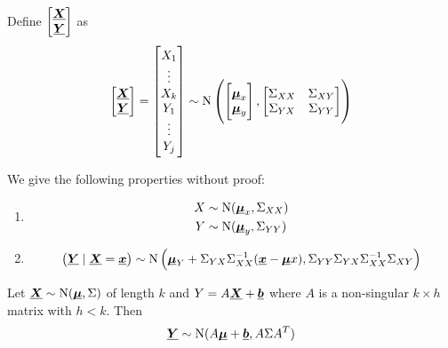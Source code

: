 \documentclass[14pt]{extarticle}
\newcommand{\Normal}{{\operatorfont N}}
\renewcommand{\vec}[1]{\uvec{#1}}
\begin{document}
\begin{proposition}
    \label{prop:multivariate:prop}
    Define $\begin{bmatrix} \vec X \\ \vec Y \end{bmatrix}$ as
    \begin{equation}
        \begin{bmatrix}
            \vec X \\ \vec Y
        \end{bmatrix}
        =
        \begin{bmatrix}
            X_1 \\ \vdots \\ X_k \\ Y_1 \\ \vdots\\ Y_j
        \end{bmatrix}
        \sim \Normal\left(
        \begin{bmatrix}
            \vec \mu_x \\ \vec \mu_y
        \end{bmatrix},
        \begin{bmatrix}
            \Sigma_{XX} & \Sigma_{XY} \\
            \Sigma_{YX} & \Sigma_{YY}
        \end{bmatrix}
        \right)
    \end{equation}

    We give the following properties without proof:
    \begin{enumerate}[label=\roman*.]
        \item \begin{align}
                  X & \sim \Normal(\vec \mu_x, \Sigma_{XX}) \\
                  Y & \sim \Normal(\vec \mu_y, \Sigma_{YY})
              \end{align}
        \item \begin{equation}
                  \left( \vec Y \mid \vec X = \vec x \right) \sim \Normal \left( \vec \mu_Y + \Sigma_{YX} \Sigma_{XX}^{-1}(\vec x - \vec \mu x), \Sigma_{YY} \Sigma_{YX} \Sigma_{XX}^{-1} \Sigma_{XY} \right)
              \end{equation}
    \end{enumerate}
\end{proposition}

\begin{proposition}
    Let $\vec X \sim \Normal(\vec \mu, \Sigma)$ of length $k$ and $Y = A \vec X + \vec b$ where $A$ is a non-singular $k \times h$ matrix with $h < k$.
    Then
    \begin{equation}
        \vec Y \sim \Normal(A \vec \mu + \vec b, A \Sigma A^T)
    \end{equation}
\end{proposition}
\end{document}
